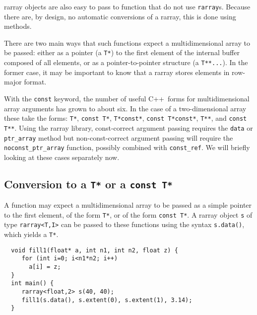 \documentclass[11pt,twoside]{article}
\newcommand{\cxx}{C{++}}
\begin{document}
rarray objects are also easy to pass to function that do not use \texttt{rarray}s. Because there are, by design, no automatic conversions of a
rarray, this is done using methods.

There are two main ways that such functions expect a multidimensional
array to be passed: either as a pointer (a \texttt{T*}) to the first
element of the internal buffer composed of all elements, or as a
pointer-to-pointer structure (a \texttt{T**...}).  In the former case, it may be
important to know that a rarray stores elements in row-major
format.

With the \texttt{const} keyword, the number of useful \cxx\ forms for multidimensional array arguments has grown to about six.  In the case of a two-dimensional array these take the forms:
 \texttt{T*}, \texttt{const T*}, \texttt{T*const*}, \texttt{const T*const*}, \texttt{T**}, and \texttt{const T**}.
Using the rarray library, const-correct argument passing requires the \texttt{data} or \texttt{ptr\_array} method but non-const-correct argument passing will require the \texttt{noconst\_ptr\_array} function, possibly combined with \texttt{const\_ref}.
We will briefly looking at these cases separately now.

\subsection{Conversion to a {\tt T*} or a {\tt const T*}}

A function may expect a multidimensional array to be passed as a
simple pointer to the first element, of the form \texttt{T*}, or of the form  \texttt{const T*}. A rarray object
\texttt{s} of type \texttt{rarray{\tt<}T,I{\tt>}} can be passed to these
functions using the syntax \texttt{s.data()}, which yields a
\texttt{T*}.

\begin{framed}\vspace{-15pt}%
\begin{verbatim}
  void fill1(float* a, int n1, int n2, float z) {
     for (int i=0; i<n1*n2; i++)
       a[i] = z;
  }
  int main() {
     rarray<float,2> s(40, 40);
     fill1(s.data(), s.extent(0), s.extent(1), 3.14);
  }
\end{verbatim}%
\end{framed}

\pagebreak[3]
\end{document}
